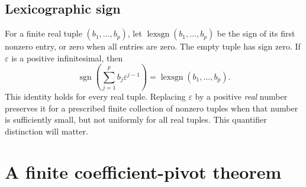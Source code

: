\documentclass[11pt,a4paper]{article}
\numberwithin{equation}{section}
\theoremstyle{plain}
\newcommand{\eps}{\varepsilon}
\newcommand{\sgn}{\operatorname{sgn}}
\newcommand{\lexsgn}{\operatorname{lexsgn}}
\begin{document}
\subsection{Lexicographic sign}
For a finite real tuple $(b_1,\ldots,b_p)$, let
$\lexsgn(b_1,\ldots,b_p)$ be the sign of its first nonzero entry, or zero
when all entries are zero. The empty tuple has sign zero. If $\eps$ is a
positive infinitesimal, then
\[
 \sgn\left(\sum_{j=1}^p b_j\eps^{j-1}\right)
 =\lexsgn(b_1,\ldots,b_p).
\]
This identity holds for every real tuple. Replacing $\eps$ by a positive
\emph{real} number preserves it for a prescribed finite collection of
nonzero tuples when that number is sufficiently small, but not uniformly
for all real tuples. This quantifier distinction will matter.

\section{A finite coefficient-pivot theorem}
\label{poly:sec:pivots}
\end{document}
